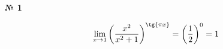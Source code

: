 \documentclass{article}
\begin{document}
\textbf{№ 1} 

\begingroup
\Large

$$ \lim\limits_{x \to 1} \left( \frac{x^2}{x^2+1} \right)^{\tg{\pi x}}
= \left( \frac{1}{2} \right)^{0}
= 1 $$

\endgroup
\end{document}
